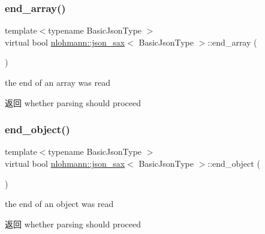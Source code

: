 \subsubsection{\texorpdfstring{end\_array()}{end\_array()}}
{\footnotesize\ttfamily template$<$typename Basic\+Json\+Type $>$ \\
virtual bool \mbox{\hyperlink{structnlohmann_1_1json__sax}{nlohmann\+::json\+\_\+sax}}$<$ Basic\+Json\+Type $>$\+::end\+\_\+array (\begin{DoxyParamCaption}{ }\end{DoxyParamCaption})\hspace{0.3cm}{\ttfamily [pure virtual]}}



the end of an array was read 

\begin{DoxyReturn}{返回}
whether parsing should proceed 
\end{DoxyReturn}
\mbox{\label{structnlohmann_1_1json__sax_ad0c722d53ff97be700ccf6a9468bd456}} 
\subsubsection{\texorpdfstring{end\_object()}{end\_object()}}
{\footnotesize\ttfamily template$<$typename Basic\+Json\+Type $>$ \\
virtual bool \mbox{\hyperlink{structnlohmann_1_1json__sax}{nlohmann\+::json\+\_\+sax}}$<$ Basic\+Json\+Type $>$\+::end\+\_\+object (\begin{DoxyParamCaption}{ }\end{DoxyParamCaption})\hspace{0.3cm}{\ttfamily [pure virtual]}}



the end of an object was read 

\begin{DoxyReturn}{返回}
whether parsing should proceed 
\end{DoxyReturn}
\mbox{\label{structnlohmann_1_1json__sax_a2e0c7ecd80b18d18a8cc76f71cfc2028}} 
